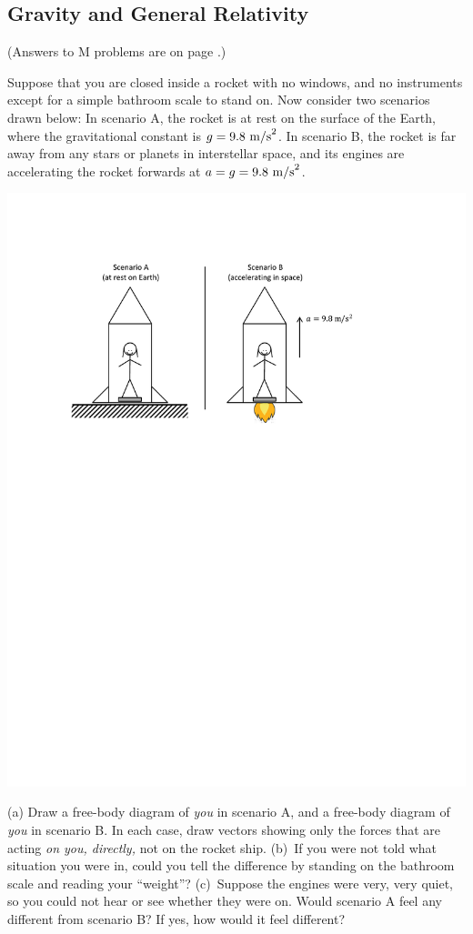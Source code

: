 \subsection{Gravity and General Relativity} 

(Answers to M problems are on page \pageref{gravity_prob_answers}.)


\begin{Exercise}[difficulty=0]
Suppose that you are closed inside a rocket with no windows, and no instruments except for a simple bathroom scale to stand on.  Now consider two scenarios drawn below: In scenario A, the rocket is at rest on the surface of the Earth, where the gravitational constant is $g=9.8~{\rm m/s}^2$. In scenario B, the rocket is far away from any stars or planets in interstellar space, and its engines are accelerating the rocket forwards at $a=g=9.8~{\rm m/s}^2$.
\begin{center}
\includegraphics[scale=0.9]{M_problems/gravity/two_rockets_equivalence.pdf}
\end{center}
(a) Draw a free-body diagram of \textit{you} in scenario A, and a free-body diagram of \textit{you} in scenario B.  In each case, draw vectors showing only the forces that are acting \textit{on you, directly,} not on the rocket ship.  (b)~If you were not told what situation you were in, could you tell the difference by standing on the bathroom scale and reading your ``weight''?  (c)~Suppose the engines were very, very quiet, so you could not hear or see whether they were on.  Would scenario A feel any different from scenario B?  If yes, how would it feel different?
\end{Exercise}


